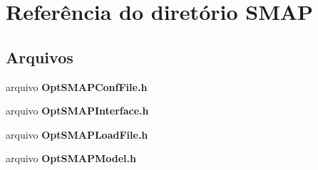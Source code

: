 \section{Referência do diretório S\+M\+AP}
\label{dir_637dedfaf8be44c1626a2b9852a250a5}
\subsection*{Arquivos}
\begin{DoxyCompactItemize}
\item 
arquivo {\bf Opt\+S\+M\+A\+P\+Conf\+File.\+h}
\item 
arquivo {\bf Opt\+S\+M\+A\+P\+Interface.\+h}
\item 
arquivo {\bf Opt\+S\+M\+A\+P\+Load\+File.\+h}
\item 
arquivo {\bf Opt\+S\+M\+A\+P\+Model.\+h}
\end{DoxyCompactItemize}

